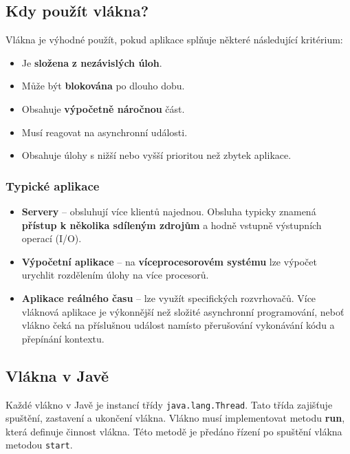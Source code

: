 \subsection{Kdy použít vlákna?}
Vlákna je výhodné použít, pokud aplikace splňuje některé následující kritérium:
\begin{itemize}
	\item Je \textbf{složena}\textbf{ z nezávislých úloh}.
	\item Může být \textbf{blokována} po dlouho dobu.
	\item Obsahuje \textbf{výpočetně náročnou} část.
	\item Musí reagovat na asynchronní události.
	\item Obsahuje úlohy s nižší nebo vyšší prioritou než zbytek aplikace.
\end{itemize}

\subsubsection{Typické aplikace}
\begin{itemize}
	\item \textbf{Servery} -- obsluhují více klientů najednou. Obsluha typicky znamená \textbf{přístup k několika sdíleným zdrojům} a hodně vstupně výstupních operací (I/O).
	\item \textbf{Výpočetní aplikace} -- na \textbf{víceprocesorovém systému} lze výpočet urychlit rozdělením úlohy na více procesorů.
	\item \textbf{Aplikace reálného času} -- lze využít specifických rozvrhovačů. Více vláknová aplikace je výkonnější než složité asynchronní programování, neboť vlákno čeká na příslušnou událost namísto přerušování vykonávání kódu a přepínání kontextu.
\end{itemize}

\subsection{Vlákna v Javě}
Každé vlákno v Javě je instancí třídy \texttt{java.lang.Thread}. Tato třída zajišťuje spuštění, zastavení a ukončení vlákna. Vlákno musí implementovat metodu \textbf{run}, která definuje činnost vlákna. Této metodě je předáno řízení po spuštění vlákna metodou \texttt{start}.

